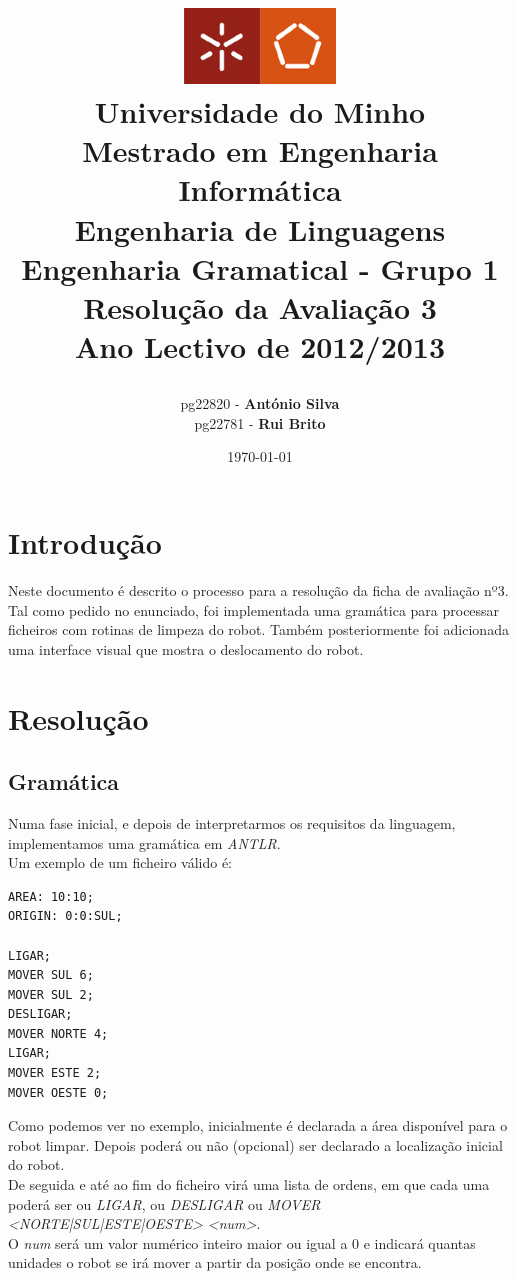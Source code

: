 \documentclass[a4paper,11pt,openright,openbib]{article}
\title{
	\large{\includegraphics[width=0.3\textwidth]{../../../report-template/UM.jpg}} \\
	\large{Universidade do Minho}  \\
	\large{Mestrado em Engenharia Informática}  \\
	\large{Engenharia de Linguagens}  \\
	\large{Engenharia Gramatical - Grupo 1}  \\	
	\large{\textbf{Resolução da Avaliação 3}} \\
	\large{Ano Lectivo de 2012/2013} \\
	\date{\today}
}
\author{	
	\begin{tabular}[t]{c c}      
        pg22820 - \textbf{António Silva} \\        
		pg22781 - \textbf{Rui Brito} \\   				
	\\ 
	\end{tabular}
}
\begin{document}
\maketitle


\pagestyle{headings}
\newpage
\tableofcontents
\newpage

\section{Introdução}
Neste documento é descrito o processo para a resolução da ficha de avaliação nº3. Tal como pedido no enunciado, foi implementada uma gramática para processar ficheiros com rotinas de limpeza do robot. Também posteriormente foi adicionada uma interface visual que mostra o deslocamento do robot.

\section{Resolução}
\label{sec:resolucao}

\subsection{Gramática} 
\label{sub:gram_tica}

Numa fase inicial, e depois de interpretarmos os requisitos da linguagem, implementamos uma gramática em \emph{ANTLR}.\\
Um exemplo de um ficheiro válido é:
\small
\begin{verbatim}
AREA: 10:10;
ORIGIN: 0:0:SUL;

LIGAR;
MOVER SUL 6;
MOVER SUL 2;
DESLIGAR;
MOVER NORTE 4;
LIGAR;
MOVER ESTE 2;
MOVER OESTE 0;
\end{verbatim}

Como podemos ver no exemplo, inicialmente é declarada a área disponível para o robot limpar. Depois poderá ou não (opcional) ser declarado a localização inicial do robot.\\
De seguida e até ao fim do ficheiro virá uma lista de ordens, em que cada uma poderá ser ou \emph{LIGAR}, ou \emph{DESLIGAR} ou \emph{MOVER <NORTE|SUL|ESTE|OESTE> <num>}.\\
O \emph{num} será um valor numérico inteiro maior ou igual a 0 e indicará quantas unidades o robot se irá mover a partir da posição onde se encontra.\\

\normalsize
\end{document}

